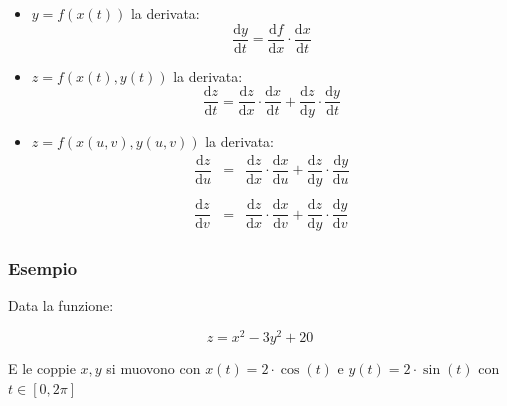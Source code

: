 \documentclass[a4paper]{article}
\begin{document}
	\begin{itemize}
		\item $y = f\left(x\left(t\right)\right)$ la derivata:
		\begin{equation*}
			\dfrac{\mathrm{d}y}{\mathrm{d}t} = \dfrac{\mathrm{d}f}{\mathrm{d}x} \cdot \dfrac{\mathrm{d}x}{\mathrm{d}t}
		\end{equation*}
		
		\item $z = f\left(x\left(t\right), y\left(t\right)\right)$ la derivata:
		\begin{equation*}
			\dfrac{\mathrm{d}z}{\mathrm{d}t} = \dfrac{\mathrm{d}z}{\mathrm{d}x} \cdot \dfrac{\mathrm{d}x}{\mathrm{d}t} + \dfrac{\mathrm{d}z}{\mathrm{d}y} \cdot \dfrac{\mathrm{d}y}{\mathrm{d}t}
		\end{equation*}
	
		\item $z = f\left(x\left(u,v\right), y\left(u,v\right)\right)$ la derivata:
		\begin{equation*}
			\begin{array}{lll}
				\dfrac{\mathrm{d}z}{\mathrm{d}u} & = & \dfrac{\mathrm{d}z}{\mathrm{d}x} \cdot \dfrac{\mathrm{d}x}{\mathrm{d}u} + \dfrac{\mathrm{d}z}{\mathrm{d}y} \cdot \dfrac{\mathrm{d}y}{\mathrm{d}u} \\
				&& \\
				\dfrac{\mathrm{d}z}{\mathrm{d}v} & = & \dfrac{\mathrm{d}z}{\mathrm{d}x} \cdot \dfrac{\mathrm{d}x}{\mathrm{d}v} + \dfrac{\mathrm{d}z}{\mathrm{d}y} \cdot \dfrac{\mathrm{d}y}{\mathrm{d}v}
			\end{array}
		\end{equation*}
	\end{itemize}
	
	\subsubsection[Esempio]{\textcolor{Green4}{Esempio}}
	
	Data la funzione:
	
	\begin{equation*}
		z = x^{2} - 3y^{2} + 20
	\end{equation*}

	\noindent
	E le coppie $x,y$ si muovono con $x\left(t\right) = 2 \cdot \cos\left(t\right)$ e $y\left(t\right) = 2 \cdot \sin\left(t\right)$ con $t \in \left[0,2\pi\right]$
	
\end{document}
